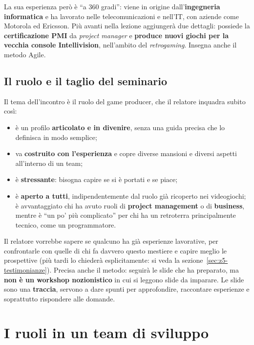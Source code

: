 La sua esperienza però è ``a 360 gradi'': viene in origine
dall'\textbf{ingegneria informatica} e ha lavorato nelle telecomunicazioni e
nell'IT, con aziende come Motorola ed Ericsson. Più avanti nella lezione
aggiungerà due dettagli: possiede la \textbf{certificazione PMI} da
\emph{project manager} e \textbf{produce nuovi giochi per la vecchia console
Intellivision}, nell'ambito del \emph{retrogaming}. Insegna anche il metodo
Agile.

\subsection{Il ruolo e il taglio del seminario}

Il tema dell'incontro è il ruolo del game producer, che il relatore inquadra
subito così:
\begin{itemize}
  \item è un profilo \textbf{articolato e in divenire}, senza una guida precisa
        che lo definisca in modo semplice;
  \item va \textbf{costruito con l'esperienza} e copre diverse mansioni e diversi
        aspetti all'interno di un team;
  \item è \textbf{stressante}: bisogna capire se si è portati e se piace;
  \item è \textbf{aperto a tutti}, indipendentemente dal ruolo già ricoperto nei
        videogiochi; è avvantaggiato chi ha avuto ruoli di \textbf{project
        management} o di \textbf{business}, mentre è ``un po' più complicato''
        per chi ha un retroterra principalmente tecnico, come un programmatore.
\end{itemize}

Il relatore vorrebbe sapere se qualcuno ha già esperienze lavorative, per
confrontarle con quelle di chi fa davvero questo mestiere e capire meglio le
prospettive (più tardi lo chiederà esplicitamente: si veda la
sezione~\ref{sec:z5-testimonianze}). Precisa anche il metodo: seguirà le slide
che ha preparato, ma \textbf{non è un workshop nozionistico} in cui si leggono
slide da imparare. Le slide sono una \textbf{traccia}, servono a dare spunti per
approfondire, raccontare esperienze e soprattutto rispondere alle domande.

\section{I ruoli in un team di sviluppo}
\label{sec:z5-ruoli}

